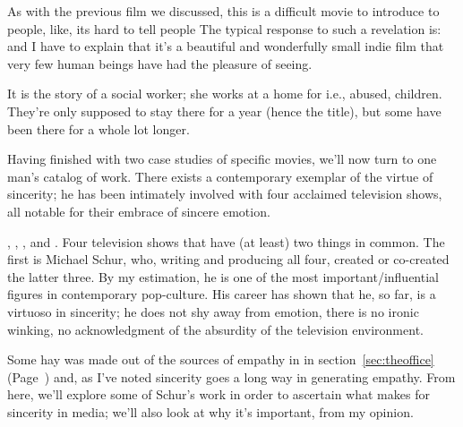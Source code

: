 \documentclass[../butidigress.tex]{subfiles}
\begin{document}
As with the previous film we discussed, this is a difficult movie to introduce to people, like, its hard to tell people 
The typical response to such a revelation is:  and I have to explain that it's a beautiful and wonderfully small indie film that very few human beings have had the pleasure of seeing.

It is the story of a social worker; she works at a home for  i.e., abused, children.
They're only supposed to stay there for a year (hence the title), but some have been there for a whole lot longer.


\entryskip

Having finished with two case studies of specific movies, we'll now turn to one man's catalog of work.
There exists a contemporary exemplar of the virtue of sincerity; he has been intimately involved with four acclaimed television shows, all notable for their embrace of sincere emotion.

, , , and .
Four television shows that have (at least) two things in common.
The first is Michael Schur, who, writing and producing all four, created or co-created the latter three.
By my estimation, he is one of the most important/influential figures in contemporary pop-culture.
His career has shown that he, so far, is a virtuoso in sincerity; he does not shy away from emotion, there is no ironic winking, no acknowledgment of the absurdity of the television environment.

Some hay was made out of the sources of empathy in  in section~\ref{sec:theoffice} (Page~\pageref{sec:theoffice}) and, as I've noted sincerity goes a long way in generating empathy.
From here, we'll explore some of Schur's work in order to ascertain what makes for sincerity in media; we'll also look at why it's important, from my opinion.
\end{document}
